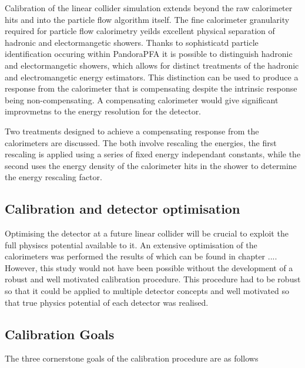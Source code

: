 Calibration of the linear collider simulation extends beyond the raw calorimeter hits and into the particle flow algorithm itself.  The fine calorimeter granularity required for particle flow calorimetry yeilds excellent physical separation of hadronic and electormangetic showers.  Thanks to sophisticatd particle identification occuring within PandoraPFA it is possible to distinguish hadronic and electormangetic showers, which allows for distinct treatments of the hadronic and electromangetic energy estimators.  This distinction can be used to produce a response from the calorimeter that is compensating despite the intrinsic response being non-compensating.  A compensating calorimeter would give significant improvmetns to the energy resolution for the detector.

Two treatments designed to achieve a compensating response from the calorimeters are discussed.  The both involve rescaling the energies, the first rescaling is applied using a series of fixed energy independant constants, while the second uses the energy density of the calorimeter hits in the shower to determine the energy rescaling factor.

\subsection{Calibration and detector optimisation}


Optimising the detector at a future linear collider will be crucial to exploit the full physiscs potential available to it.  An extensive optimisation of the calorimeters was performed the results of which can be found in chapter ....  However, this study would not have been possible without the development of a robust and well motivated calibration procedure.  This procedure had to be robust so that it could be applied to multiple detector concepts and well motivated so that true physics potential of each detector was realised.

\subsection{Calibration Goals}

The three cornerstone goals of the calibration procedure are as follows

